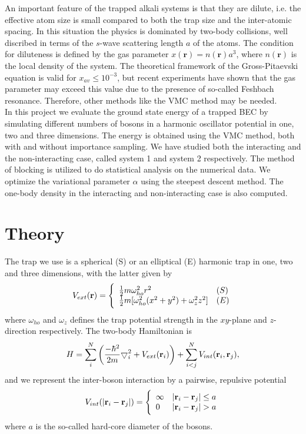 \documentclass[english, a4paper]{article}
\begin{document}
\noindent An important feature of the trapped alkali systems is that they are dilute, i.e. the effective atom size
is small compared to both the trap size and the inter-atomic spacing. In this situation the physics is
dominated by two-body collisions, well discribed in terms of the $s$-wave scattering length $a$ of the atoms.
The condition for diluteness is defined by the gas parameter $x(\mathbf{r}) = n(\mathbf{r})a^3$, where $n(\mathbf{r})$
is the local density of the system. The theoretical framework of the Gross-Pitaevski equation is valid for $x_{av} \leq 10^{-3}$,
but recent experiments have shown that the gas parameter may exceed this value due to the presence of so-called Feshbach resonance.
Therefore, other methods like the VMC method may be needed. \\

\noindent In this project we evaluate the ground state energy of a trapped BEC by simulating different numbers of bosons
in a harmonic oscillator potential in one, two and three dimensions. The energy is obtained using the VMC method, both with 
and without importance sampling. We have studied both the interacting and the non-interacting case, called system 1
and system 2 respectively. The method of blocking is utilized to do statistical analysis on
the numerical data. We optimize the variational parameter $\alpha$ using the steepest descent method. The one-body 
density in the interacting and non-interacting case is also computed. 



\section{Theory}
The trap we use is a spherical (S) or an elliptical (E) harmonic trap in one, two and three dimensions, with the latter given by
\begin{equation}
 V_{ext}({\bf r}) = 
 \Bigg\{
\begin{array}{ll}
	 \frac{1}{2}m\omega_{ho}^2r^2 & (S)\\
 \strut
	 \frac{1}{2}m[\omega_{ho}^2(x^2+y^2) + \omega_z^2z^2] & (E)
 \label{trap_eqn}
\end{array}
\end{equation}
where $\omega_{ho}$ and $\omega_z$ defines the trap potential strength in the $xy$-plane and $z$-direction respectively.
The two-body Hamiltonian is
 \begin{equation}
     H = \sum_i^N \left(
	 \frac{-\hbar^2}{2m}
	 { \bigtriangledown }_{i}^2 +
	 V_{ext}({\bf{r}}_i)\right)  +
	 \sum_{i<j}^{N} V_{int}({\bf{r}}_i,{\bf{r}}_j),
 \end{equation}
 and we represent the inter-boson interaction by a pairwise, repulsive potential
 \begin{equation}
 V_{int}(|{\bf r}_i-{\bf r}_j|) =  \Bigg\{
 \begin{array}{ll}
	 \infty & {|{\bf r}_i-{\bf r}_j|} \leq {a}\\
	 0 & {|{\bf r}_i-{\bf r}_j|} > {a}
 \end{array}
 \end{equation}
 where ${a}$ is the so-called hard-core diameter of the bosons.
 
\end{document}
